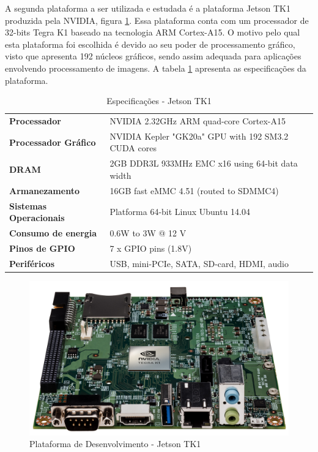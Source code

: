 A segunda plataforma a ser utilizada e estudada é a plataforma Jetson TK1 produzida pela NVIDIA, figura \ref{jetson_tk1}. Essa plataforma conta com um processador de 32-bits Tegra K1 baseado na tecnologia ARM Cortex-A15. O motivo pelo qual esta plataforma foi escolhida é devido ao seu poder de processamento gráfico, visto que apresenta 192 núcleos gráficos, sendo assim adequada para aplicações envolvendo processamento de imagens. A tabela \ref{jetson_tk1_tab} apresenta as especificações da plataforma.

\begin{table}[]
\centering
\caption{Especificações - Jetson TK1}
\label{jetson_tk1_tab}
\begin{tabular}{ll}
\textbf{Processador}           & NVIDIA 2.32GHz ARM quad-core Cortex-A15              \\
\textbf{Processador Gráfico}   & NVIDIA Kepler "GK20a" GPU  with 192 SM3.2 CUDA cores \\
\textbf{DRAM}                  & 2GB DDR3L 933MHz EMC x16 using 64-bit data width     \\
\textbf{Armanezamento}         & 16GB fast eMMC 4.51 (routed to SDMMC4)               \\
\textbf{Sistemas Operacionais} & Platforma 64-bit Linux Ubuntu 14.04                  \\
\textbf{Consumo de energia}    & 0.6W to 3W @ 12 V                                    \\
\textbf{Pinos de GPIO}         & 7 x GPIO pins (1.8V)                                 \\
\textbf{Periféricos}           & USB, mini-PCIe, SATA, SD-card, HDMI, audio          
\end{tabular}
\end{table}

\begin{figure}[H]
 	\centering
 	\includegraphics[scale=0.10]{./Resources/jetson_tk1.jpg}
 	\caption{Plataforma de Desenvolvimento - Jetson TK1}
 	\label{jetson_tk1}
\end{figure}

